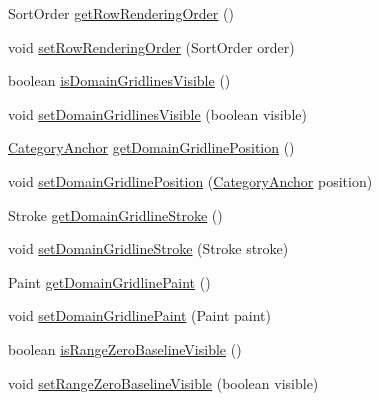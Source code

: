 \begin{DoxyCompactItemize}
\item 
Sort\+Order \mbox{\hyperlink{classorg_1_1jfree_1_1chart_1_1plot_1_1_category_plot_a64430e6feca3cbcf5ef475e3c34b488e}{get\+Row\+Rendering\+Order}} ()
\item 
void \mbox{\hyperlink{classorg_1_1jfree_1_1chart_1_1plot_1_1_category_plot_ac4324fcc47e9e5a7b37a7bed1284c656}{set\+Row\+Rendering\+Order}} (Sort\+Order order)
\item 
boolean \mbox{\hyperlink{classorg_1_1jfree_1_1chart_1_1plot_1_1_category_plot_a597b375b0629f51761c50881045a2f99}{is\+Domain\+Gridlines\+Visible}} ()
\item 
void \mbox{\hyperlink{classorg_1_1jfree_1_1chart_1_1plot_1_1_category_plot_a8abc131b37e368eda1d81c22974386ae}{set\+Domain\+Gridlines\+Visible}} (boolean visible)
\item 
\mbox{\hyperlink{classorg_1_1jfree_1_1chart_1_1axis_1_1_category_anchor}{Category\+Anchor}} \mbox{\hyperlink{classorg_1_1jfree_1_1chart_1_1plot_1_1_category_plot_a030d3c1500bfe6fe212be4f25e149405}{get\+Domain\+Gridline\+Position}} ()
\item 
void \mbox{\hyperlink{classorg_1_1jfree_1_1chart_1_1plot_1_1_category_plot_a3a98acbf2d67788bfd36f4e9fa1c2c67}{set\+Domain\+Gridline\+Position}} (\mbox{\hyperlink{classorg_1_1jfree_1_1chart_1_1axis_1_1_category_anchor}{Category\+Anchor}} position)
\item 
Stroke \mbox{\hyperlink{classorg_1_1jfree_1_1chart_1_1plot_1_1_category_plot_a3ea6085f3ef4c8c76c1e2ed9e8f6650b}{get\+Domain\+Gridline\+Stroke}} ()
\item 
void \mbox{\hyperlink{classorg_1_1jfree_1_1chart_1_1plot_1_1_category_plot_adc1912c7460d4b7cfbf5cec73e21c31b}{set\+Domain\+Gridline\+Stroke}} (Stroke stroke)
\item 
Paint \mbox{\hyperlink{classorg_1_1jfree_1_1chart_1_1plot_1_1_category_plot_a6fb5fd2f2f6b005667d2b0787385e5ae}{get\+Domain\+Gridline\+Paint}} ()
\item 
void \mbox{\hyperlink{classorg_1_1jfree_1_1chart_1_1plot_1_1_category_plot_ad40d88e79916f70d4b3f52905440c941}{set\+Domain\+Gridline\+Paint}} (Paint paint)
\item 
boolean \mbox{\hyperlink{classorg_1_1jfree_1_1chart_1_1plot_1_1_category_plot_a32cccbcca493597d95bf54338573cc0a}{is\+Range\+Zero\+Baseline\+Visible}} ()
\item 
void \mbox{\hyperlink{classorg_1_1jfree_1_1chart_1_1plot_1_1_category_plot_a8c045c78c8456162ac2c58f4d2fe015d}{set\+Range\+Zero\+Baseline\+Visible}} (boolean visible)
\item 

\end{DoxyCompactItemize}
